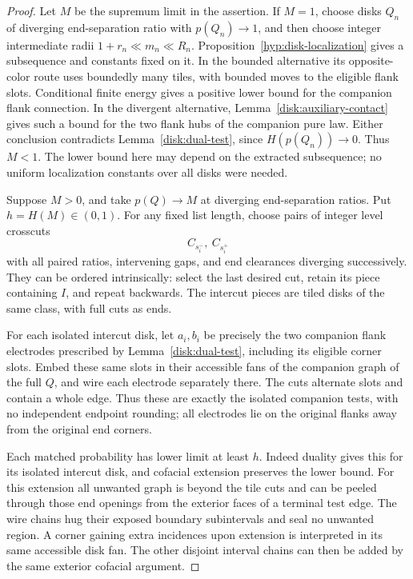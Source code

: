 \begin{proof}
Let \(M\) be the supremum limit in the assertion.  If \(M=1\),
choose disks \(Q_n\) of diverging end-separation ratio with
\(p(Q_n)\to1\), and then choose integer intermediate radii
\(1+r_n\ll m_n\ll R_n\).  Proposition~\ref{hyp:disk-localization} gives a subsequence and
constants fixed on it.
In the bounded alternative its opposite-color route uses boundedly
many tiles, with bounded moves to the eligible flank slots.  Conditional
finite energy gives a positive lower bound for the companion flank
connection.  In the divergent alternative,
Lemma~\ref{disk:auxiliary-contact} gives such a bound for the two
flank hubs of the companion pure law.  Either conclusion contradicts
Lemma~\ref{disk:dual-test}, since \(H(p(Q_n))\to0\).  Thus \(M<1\).
The lower bound here may depend on the extracted subsequence; no
uniform localization constants over all disks were needed.

Suppose \(M>0\), and take \(p(Q)\to M\) at diverging
end-separation ratios.  Put \(h=H(M)\in(0,1)\).
For any fixed list length, choose pairs of integer level
crosscuts
\[
 C_{s_i^-},\ C_{s_i^+}
\]
with all paired ratios, intervening gaps, and end
clearances diverging successively.  They can be ordered
intrinsically: select the last desired cut, retain its
piece containing \(I\), and repeat backwards.  The
intercut pieces are tiled disks of the same class,
with full cuts as ends.

For each isolated intercut disk, let \(a_i,b_i\) be precisely
the two companion flank electrodes prescribed by
Lemma~\ref{disk:dual-test}, including its eligible corner slots.
Embed these same slots in their accessible fans of the companion graph
of the full \(Q\), and wire each electrode separately there.
The cuts alternate slots and contain a whole edge.  Thus these are
exactly the isolated companion tests, with no independent endpoint
rounding; all electrodes lie on the original flanks away from the
original end corners.

Each matched probability has lower limit at least \(h\).
Indeed duality gives this for its isolated intercut disk,
and cofacial extension preserves the lower bound.
For this extension all unwanted graph is beyond the
tile cuts and can be peeled through those end openings
from the exterior faces of a terminal test edge.
The wire chains hug their exposed boundary subintervals
and seal no unwanted region.  A corner gaining extra
incidences upon extension is interpreted in its same
accessible disk fan.  The other disjoint interval
chains can then be added by the same exterior
cofacial argument.


\end{proof}
